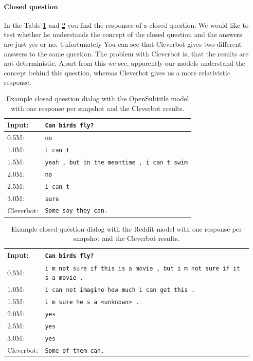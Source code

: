 \paragraph{Closed question}In the Table \ref{results:example2_output:OpenSubtitle_compared} and \ref{results:example2_output:Reddit_compared} you find the responses of a closed question. We would like to test whether he understands the concept of the closed question and the answers are just yes or no. Unfortunately You can see that Cleverbot gives two different answers to the same question. The problem with Cleverbot is, that the results are not deterministic. 
Apart from this we see, apparently our models understand the concept behind this question, whereas Cleverbot gives us a more relativistic response.
	
\begin{table}[H]
	\centering
	\begin{adjustbox}{max width=\textwidth}
		\begin{tabular}{ll}
			\toprule
			Input: 	& \texttt{Can birds fly?}\\
			\midrule
			0.5M: 	& \texttt{no}\\
			1.0M: 	& \texttt{i can t}\\
			1.5M:	& \texttt{yeah , but in the meantime , i can t swim}\\
			2.0M:	& \texttt{no}\\
			2.5M:	& \texttt{i can t}\\
			3.0M:	& \texttt{sure}\\
			Cleverbot:	& \texttt{Some say they can.}\\
			\bottomrule
		\end{tabular}
	\end{adjustbox}
	\caption{Example closed question dialog with the OpenSubtitle model with one response per snapshot and the Cleverbot results.}
	\label{results:example2_output:OpenSubtitle_compared}
\end{table}
\begin{table}[H]
	\centering
	\begin{adjustbox}{max width=\textwidth}
		\begin{tabular}{ll}
			\toprule
			Input: 	& \texttt{Can birds fly?}\\
			\midrule
			0.5M: 	& \texttt{i m not sure if this is a movie , but i m not sure if it s a movie .}\\
			1.0M: 	& \texttt{i can not imagine how much i can get this .}\\
			1.5M:	& \texttt{i m sure he s a <unknown> .}\\
			2.0M:	& \texttt{yes}\\
			2.5M:	& \texttt{yes}\\
			3.0M:	& \texttt{yes}\\
			Cleverbot:	& \texttt{Some of them can.}\\
			\bottomrule
		\end{tabular}
	\end{adjustbox}
	\caption{Example closed question dialog with the Reddit model with one response per snapshot and the Cleverbot results.}
	\label{results:example2_output:Reddit_compared}
\end{table}

